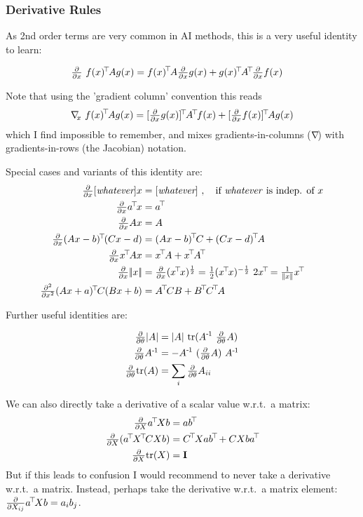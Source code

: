 \subsubsection{Derivative Rules}

As 2nd order terms are very common in AI methods, this is a very useful identity to learn:
\begin{Identities}
\begin{align}
\Del x~ f(x)^\T A g(x)
 &= f(x)^\T A \Del x g(x) + g(x)^\T A^\T \Del x f(x)
\end{align}
\end{Identities}
Note that using the 'gradient column' convention this reads
\begin{equation}
\na_x~ f(x)^\T A g(x) = [\Del x  g(x)]^\T A^\T f(x) + [\Del x f(x)]^\T A g(x) 
\end{equation}
which I find impossible to remember, and mixes gradients-in-columns
(${\nabla_{\!\!}}$) with gradients-in-rows (the Jacobian) notation.

Special cases and variants of this identity are:
\begin{align}
\Del x [\textit{whatever}] x
&= [\textit{whatever}] \comma\text{if \textit{whatever} is indep. of $x$} \\
\Del x a^\T x
&= a^\T \\
\Del x A x
&= A \\
\Del x (A x - b)^\T (C x - d)
&= (A x - b)^\T C + (C x - d )^\T A \\
\Del x x^\T A x
&= x^\T A + x^\T A^\T\\
\Del x \norm{x}
&= \Del x (x^\T x)^\half = \half (x^\T x)^{-\half}~ 2 x^\T = \frac{1}{\norm{x}} x^\T \\
\Hes x (Ax+a)^\T C (Bx+b)
&= A^\T C B + B^\T C^\T A 
\end{align}

Further useful identities are:
\begin{Identities}
\begin{align}
\textstyle\frac{\partial}{\partial \theta} |A|
 &= |A|~ {\rm tr}(A^{{\hspace*{-.0pt}\text{\rm -}\hspace*{-.5pt}}1}~ \textstyle\frac{\partial}{\partial \theta} A) \\
\textstyle\frac{\partial}{\partial \theta} A^{{\hspace*{-.0pt}\text{\rm -}\hspace*{-.5pt}}1}
 &= - A^{{\hspace*{-.0pt}\text{\rm -}\hspace*{-.5pt}}1}~ (\textstyle\frac{\partial}{\partial \theta} A)~ A^{{\hspace*{-.0pt}\text{\rm -}\hspace*{-.5pt}}1} \\
\textstyle\frac{\partial}{\partial \theta} {\rm tr}(A)
 &= \sum_i \textstyle\frac{\partial}{\partial \theta} A_{ii}
\end{align}
\end{Identities}

We can also directly take a derivative of a scalar value w.r.t.\ a
matrix:
\begin{align}
\Del X a^\T X b
 &= ab^\T \\
\Del X (a^\T X^\T C X b)
 & = C^\T X a b^\T + C X b a^\T \\
\Del X \tr(X)
 &= \Id
\end{align}
But if this leads to confusion I would recommend to never take a
derivative w.r.t.\ a matrix. Instead, perhaps take the derivative
w.r.t.\ a matrix element: $\textstyle\frac{\partial}{\partial X_{ij}} a^{\!\top\!} X b = a_i b_j$.

